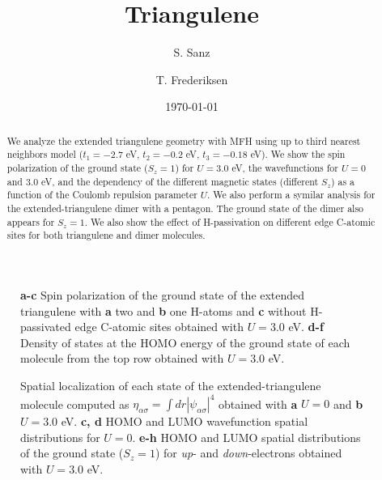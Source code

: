 \documentclass[twocolumn,amsmath,%
amssymb,prb,superscriptaddress]{revtex4}
\begin{document}
\title{Triangulene}

\author{S. Sanz}

\author{T. Frederiksen}

\date{\today}

\begin{abstract}
We analyze the extended triangulene geometry with MFH using up to third nearest neighbors model ($t_{1}=-2.7$ eV, $t_{2}=-0.2$ eV, $t_{3}=-0.18$ eV). We show the spin polarization of the ground state ($S_{z}=1$) for $ U=3.0$ eV, the wavefunctions for $U=0$ and $3.0$ eV, and the dependency of the different magnetic states (different $S_{z}$) as a function of the Coulomb repulsion parameter $U$. We also perform a symilar analysis for the extended-triangulene dimer with a pentagon. The ground state of the dimer also appears for $S_{z}=1$. We also show the effect of H-passivation on different edge C-atomic sites for both triangulene and dimer molecules.
\end{abstract}

\maketitle

\begin{figure*}
	\scalebox{.6}{}
	\caption{\textbf{a-c} Spin polarization of the ground state of the extended triangulene with \textbf{a} two and \textbf{b} one H-atoms and \textbf{c} without H-passivated edge C-atomic sites obtained with $U=3.0$ eV. \textbf{d-f} Density of states at the HOMO energy of the ground state of each molecule from the top row obtained with $U=3.0$ eV.}
\end{figure*}

\begin{figure*}
	\scalebox{.7}{}
	\caption{Spatial localization of each state of the extended-triangulene molecule computed as $\eta_{\alpha\sigma}=\int dr|\psi_{\alpha\sigma}|^{4}$ obtained with \textbf{a} $U=0$ and \textbf{b} $U=3.0$ eV. \textbf{c, d} HOMO and LUMO wavefunction spatial distributions for $U=0$. \textbf{e-h} HOMO and LUMO spatial distributions of the ground state ($S_{z}=1$) for \emph{up}- and \emph{down}-electrons obtained with $U=3.0$ eV.}
\end{figure*}
\end{document}
